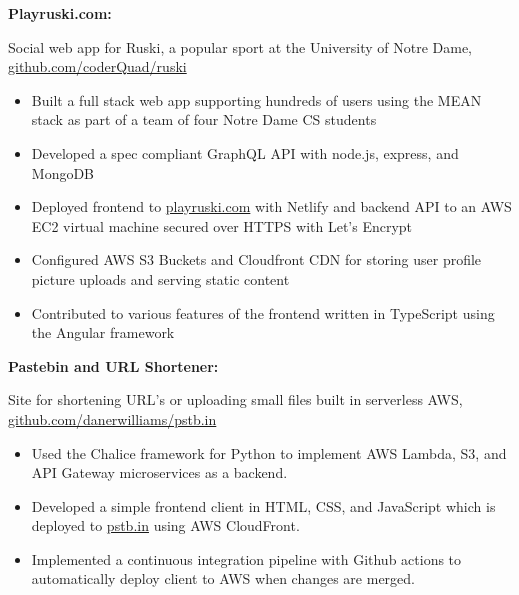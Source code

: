 \documentclass[letterpaper,10pt]{article}
\newcommand{\resumeItem}[2]{
  \item\small{
    {#1}{#2 \vspace{-2pt}}
  }
}
\newcommand{\resumeSubItem}[2]{\resumeItem{#1}{#2}\vspace{-4pt}}
\begin{document}
{     \resumeSubItem{\textbf{Playruski.com: }}
     { Social web app for Ruski, a popular sport at the University of Notre Dame, \href{https://github.com/coderQuad/ruski}{github.com/coderQuad/ruski}
        \vspace{-5pt}
        \begin{itemize}
            \item Built a full stack web app supporting hundreds of users using the MEAN stack as part of a team of four Notre Dame CS students
            \vspace{-2pt}
            \item Developed a spec compliant GraphQL API with node.js, express, and MongoDB
            \vspace{-2pt}
            \item Deployed frontend to \href{https://www.playruski.com}{playruski.com} with Netlify and backend API to an AWS EC2 virtual machine secured over HTTPS with Let's Encrypt
            \vspace{-2pt}
            \item Configured AWS S3 Buckets and Cloudfront CDN for storing user profile picture uploads and serving static content
            \vspace{-2pt}
            \item Contributed to various features of the frontend written in TypeScript using the Angular framework
        \end{itemize}
     } 

     \vspace{2pt}

      \resumeSubItem{\textbf{Pastebin and URL Shortener: }}
      { Site for shortening URL's or uploading small files built in serverless AWS, \href{https://github.com/danerwilliams/pstb.in}{github.com/danerwilliams/pstb.in}
         \vspace{-5pt}
         \begin{itemize}
            \item Used the Chalice framework for Python to implement AWS Lambda, S3, and API Gateway microservices as a backend.
            \vspace{-2pt}
            \item Developed a simple frontend client in HTML, CSS, and JavaScript which is deployed to \href{https://www.pstb.in}{pstb.in} using AWS CloudFront.
            \vspace{-2pt}
            \item Implemented a continuous integration pipeline with Github actions to automatically deploy client to AWS when changes are merged.
         \end{itemize}
      }

}
\end{document}
